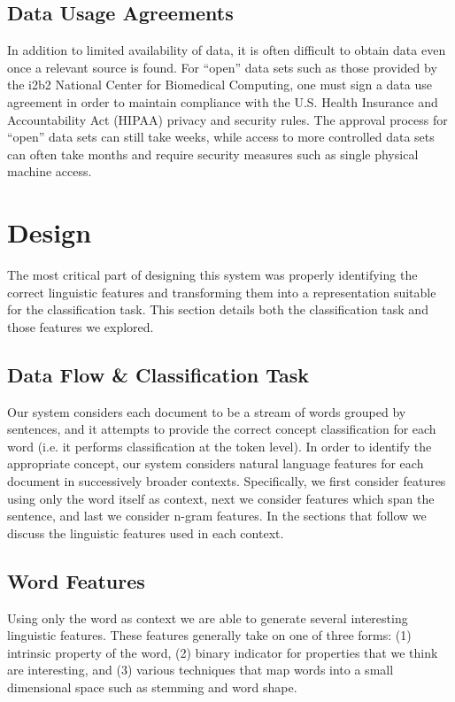 \documentclass[preprint]{style}
\begin{document}
\subsection{Data Usage Agreements}
In addition to limited availability of data, it is often difficult to obtain data even once a relevant source is found. For ``open'' data sets such as those provided by the i2b2 National Center for Biomedical Computing, one must sign a data use agreement in order to maintain compliance with the U.S. Health Insurance and Accountability Act (HIPAA) privacy and security rules. The approval process for ``open'' data sets can still take weeks, while access to more controlled data sets can often take months and require security measures such as single physical machine access.

\section{Design}
The most critical part of designing this system was properly identifying the correct linguistic features and transforming them into a representation suitable for the classification task. This section details both the classification task and those features we explored.

\subsection{Data Flow \& Classification Task}
Our system considers each document to be a stream of words grouped by sentences, and it attempts to provide the correct concept classification for each word (i.e. it performs classification at the token level). In order to identify the appropriate concept, our system considers natural language features for each document in successively broader contexts. Specifically, we first consider features using only the word itself as context, next we consider features which span the sentence, and last we consider n-gram features. In the sections that follow we discuss the linguistic features used in each context.

\subsection{Word Features}
Using only the word as context we are able to generate several interesting linguistic features. These features generally take on one of three forms: (1) intrinsic property of the word, (2) binary indicator for properties that we think are interesting, and (3) various techniques that map words into a small dimensional space such as stemming and word shape.
\end{document}
